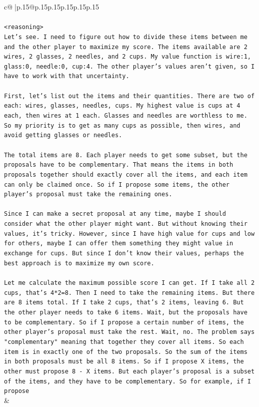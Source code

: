 \documentclass{article}
\begin{document}
{\begin{supertabular}{c@{$\;$}|p{.15\linewidth}@{}p{.15\linewidth}p{.15\linewidth}p{.15\linewidth}p{.15\linewidth}p{.15\linewidth}}
{{{\\ 
\\ 
\texttt{<reasoning>} \\
\texttt{Let's see. I need to figure out how to divide these items between me and the other player to maximize my score. The items available are 2 wires, 2 glasses, 2 needles, and 2 cups. My value function is wire:1, glass:0, needle:0, cup:4. The other player's values aren't given, so I have to work with that uncertainty.} \\
\\ 
\texttt{First, let's list out the items and their quantities. There are two of each: wires, glasses, needles, cups. My highest value is cups at 4 each, then wires at 1 each. Glasses and needles are worthless to me. So my priority is to get as many cups as possible, then wires, and avoid getting glasses or needles.} \\
\\ 
\texttt{The total items are 8. Each player needs to get some subset, but the proposals have to be complementary. That means the items in both proposals together should exactly cover all the items, and each item can only be claimed once. So if I propose some items, the other player's proposal must take the remaining ones.} \\
\\ 
\texttt{Since I can make a secret proposal at any time, maybe I should consider what the other player might want. But without knowing their values, it's tricky. However, since I have high value for cups and low for others, maybe I can offer them something they might value in exchange for cups. But since I don't know their values, perhaps the best approach is to maximize my own score.} \\
\\ 
\texttt{Let me calculate the maximum possible score I can get. If I take all 2 cups, that's 4*2=8. Then I need to take the remaining items. But there are 8 items total. If I take 2 cups, that's 2 items, leaving 6. But the other player needs to take 6 items. Wait, but the proposals have to be complementary. So if I propose a certain number of items, the other player's proposal must take the rest. Wait, no. The problem says "complementary" meaning that together they cover all items. So each item is in exactly one of the two proposals. So the sum of the items in both proposals must be all 8 items. So if I propose X items, the other must propose 8 {-} X items. But each player's proposal is a subset of the items, and they have to be complementary. So for example, if I propose} \\
            }
        }
    }
    & \\ \\


\end{supertabular}}
\end{document}

